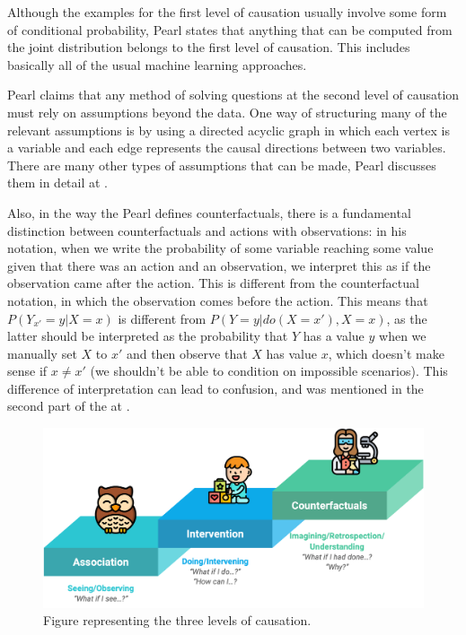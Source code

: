 Although the examples for the first level of causation usually involve some form of conditional probability, Pearl states that anything that can be computed from the joint distribution belongs to the first level of causation. This includes basically all of the usual machine learning approaches. 

Pearl claims that any method of solving questions at the second level of causation must rely on assumptions beyond the data. One way of structuring many of the relevant assumptions is by using a directed acyclic graph in which each vertex is a variable and each edge represents the causal directions between two variables. There are many other types of assumptions that can be made, Pearl discusses them in detail at \cite{Causality}.

Also, in the way the Pearl defines counterfactuals, there is a fundamental distinction between counterfactuals and actions with observations: in his notation, when we write the probability of some variable reaching some value given that there was an action and an observation, we interpret this as if the observation came after the action. This is different from the counterfactual notation, in which the observation comes before the action. This means that $P(Y_{x'} = y| X=x)$ is different from $P(Y=y|do(X=x'),X=x)$, as the latter should be interpreted as the probability that $Y$ has a value $y$ when we manually set $X$ to $x'$ and then observe that $X$ has value $x$, which doesn't make sense if $x \neq x'$ (we shouldn't be able to condition on impossible scenarios). This difference of interpretation can lead to confusion, and was mentioned in the second part of the  at \cite[Subsection~11.7.2]{Causality}.

\begin{figure}[ht]
\centering
\includegraphics[width=\textwidth]{levsCaus}
\caption{Figure representing the three levels of causation.}\label{fig:levsCaus}
\end{figure}

